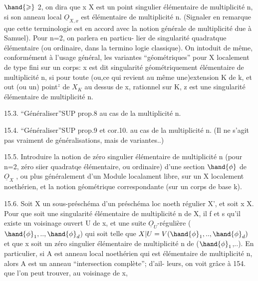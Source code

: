 
$\hand{\geqslant}$ 2, on dira que x \hand{$\in$} X est un point singulier élémentaire de multiplicité
n, si son anneau local $\underline{O}_{X,x}$ est élémentaire de multiplicité n. (Signaler
en remarque que cette  terminologie est en accord avec la notion
générale de multiplicité due à Samuel). Pour n=2, on parlera en particu-%
lier de singularité quadratque élémentaire (ou ordinaire, dans la termino
logie classique). On intoduit de même, conformément à l'usage général,
les variantes ``géométriques'' pour X localement de type fini sur un corps:
x  est dit singularité géométriquement élémentaire de multiplicité n, si
pour toute (ou,ce qui revient au même\over{\unsure{;}}{\unsure{,}} une)extension K de k, et out
(ou un) point$^{z}$ de $X_{K}$ au dessus de x, rationnel sur K, z est une
singularité élémentaire de multiplicité n.

15.3. ``Généraliser''SUP prop.8 au cas de la multiplicité n.

15.4. ``Généraliser''SUP prop.9 et cor.10. au cas de la multiplicité n.
(Il ne s'agit pas vraiment de généralisations, mais de variantes..)

15.5. Introduire la notion de zéro singulier élémentaire de multiplicité
n (pour n=2, zéro siier quadratqe élémentaire, ou ordinaire) d'une
section $\hand{\phi}$ de $\underline{O}_{X}$ , ou plus généralement d'un Module localament libre, sur
un X localement noethérien, et la notion géométrique correspondante
(sur un corps de base k).

15.6. Soit X un sous-préschéma d'un préschéma loc noeth régulier X', et
soit x \hand{$\in$}X. Pour que  soit une singularité élémentaire de multiplicité
n de X, il f et s qu'il existe un voisinage ouvert U de x, et une
suite $\underline{O}_{U}$-régulière ($\hand{\phi}_{1},..,\hand{\phi}_{d}$) qui soit telle que $X|U = V(\hand{\phi}_{1},..,\hand{\phi}_{d})$ et
que x soit un zéro singulier élémentaire de multiplicité n de ($\hand{\phi}_{1}$,..).
En particulier, si A est anneau local noethérien qui est élémentaire
\margin{$\Vert$} de multiplicité n, alors A est un anneau ``intersection complète''; d'ail-%
leurs, on voit grâce à 154. que l'on peut trouver, au voisinage de x,

